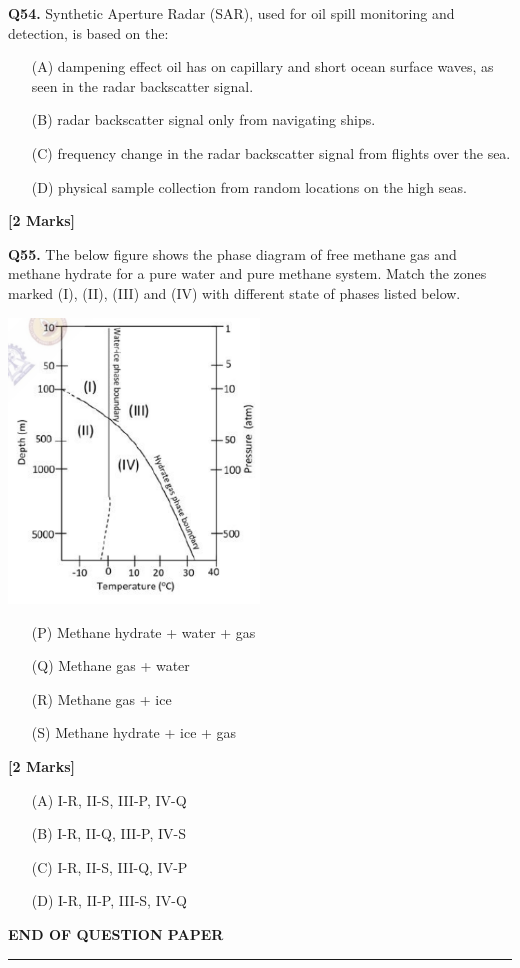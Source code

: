 \documentclass[11pt]{article}
\newcommand{\questionb}[2]{
    \noindent\textbf{Q#2.} #1 \hfill \textbf{[2 Marks]}
}
\begin{document}
\questionb{Synthetic Aperture Radar (SAR), used for oil spill monitoring and detection, is based on the:
\begin{enumerate}
    \item [(A)] dampening effect oil has on capillary and short ocean surface waves, as seen in the radar backscatter signal.
    \item [(B)] radar backscatter signal only from navigating ships.
    \item [(C)] frequency change in the radar backscatter signal from flights over the sea.
    \item [(D)] physical sample collection from random locations on the high seas.
\end{enumerate}
}{54}
\vspace{0.5cm}

\questionb{The below figure shows the phase diagram of free methane gas and methane hydrate for a pure water and pure methane system. Match the zones marked (I), (II), (III) and (IV) with different state of phases listed below.
\begin{center}
\includegraphics[width=0.5\textwidth]{figures/55.png}
\end{center}
\begin{enumerate}
    \item [(P)] Methane hydrate + water + gas
    \item [(Q)]Methane gas + water
    \item [(R)]Methane gas + ice
    \item [(S)]Methane hydrate + ice + gas
\end{enumerate}}{55}
\begin{enumerate}
    \item [(A)] I-R, II-S, III-P, IV-Q
    \item [(B)]I-R, II-Q, III-P, IV-S
    \item [(C)]I-R, II-S, III-Q, IV-P
    \item [(D)]I-R, II-P, III-S, IV-Q
\end{enumerate}
\vspace{0.5cm}

\begin{center}
\textbf{END OF QUESTION PAPER}
\rule{\textwidth}{0.5pt} 
\end{center}
\end{document}
